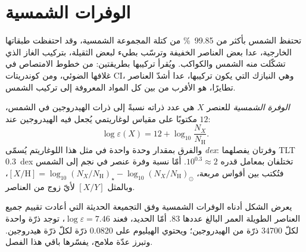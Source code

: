 \section{الوفرات الشمسية}\label{sec:b3:origin-of-elements:solar}

تحتفظ الشمس بأكثر من \qty{99.85}{\percent} من كتلة المجموعة الشمسية،
وقد احتفظت طبقاتها الخارجية، عدا بعض العناصر الخفيفة وترسّب بطيء لبعض الثقيلة،
بتركيب الغاز الذي تشكّلت منه الشمس والكواكب.
ويُقرأ تركيبها بطريقتين: من خطوط الامتصاص في غلافها الضوئي،
ومن كوندريتات CI، وهي النيازك التي يكون تركيبها،
عدا أشدّ العناصر تطايرًا، هو الأقرب من بين كل المواد المعروفة
إلى تركيب الشمس.

\begin{definition}\label{def:b3:origin-of-elements:abundance}
\emph{الوفرة الشمسية} للعنصر $X$ هي
عدد ذراته نسبةً إلى ذرات الهيدروجين في الشمس،
مكتوبًا على مقياس لوغاريتمي يُجعل فيه الهيدروجين عند $12$:
\[
\log\varepsilon(X) = 12 + \log_{10}\frac{N_X}{N_\mathrm{H}} .
\]
والفرق بمقدار وحدة واحدة في مثل هذا اللوغاريتم يُسمّى
\emph{dex}: وفرتان يفصلهما \mbox{\textdir TLT $0.3$~dex} تختلفان بمعامل
قدره $10^{0.3} \approx 2$. أمّا نسبة وفرة عنصر في نجم إلى الشمس
فتُكتب بين أقواس مربعة،
$[X/\mathrm{H}] = \log_{10}(N_X/N_\mathrm{H})_\star -
\log_{10}(N_X/N_\mathrm{H})_\odot$، وبالمثل $[X/Y]$ لأيّ زوج
من العناصر.
\end{definition}

يعرض الشكل أدناه الوفرات الشمسية وفق التجميعة الحديثة
التي أعادت تقييم جميع العناصر الطويلة العمر البالغ عددها 83. أمّا الحديد، فعند
$\log\varepsilon = 7.46$، توجد ذرّة واحدة لكلّ \num{34700} ذرّة من
الهيدروجين؛ ويحتوي الهيليوم على \num{0.0820} ذرّة لكلّ ذرّة هيدروجين. وتبرز عدّة
ملامح، يفسّرها باقي هذا الفصل.

